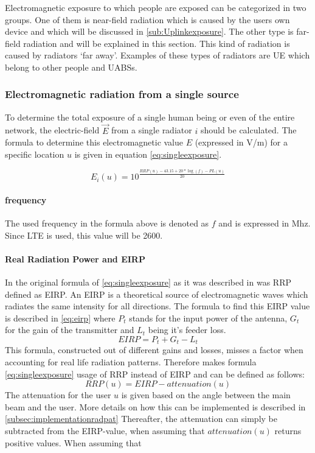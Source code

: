 Electromagnetic exposure to which people are exposed can be categorized in two groups. One of them is near-field radiation which is caused 
by the users own device and which will be discussed in \ref{sub:Uplinkexposure}.
The other type is far-field radiation and will be explained in this section. This kind of radiation is caused by radiators `far away'.
Examples of these types of radiators are \gls{UE} which belong to other people and \gls{UABS}s. 

\subsubsection{Electromagnetic radiation from a single source}
\label{sec:calculatingexposure}

To determine the total exposure of a single human being or even of the entire network, the electric-field $\vec{E}$ from a single radiator $i$ should be calculated.
The formula to determine this electromagnetic value $E$ (expressed in V/m) for a specific location $u$ is given in equation \ref{eq:singleexposure}.

\begin{equation}
E_i(u) = 10^{\frac{RRP(u) - 43.15 + 20*\log(f)- PL(u)}{20}}
\label{eq:singleexposure}
\end{equation}

\paragraph{frequency}
The used frequency in the formula above is denoted as $f$ and is expressed in Mhz. Since LTE is used, this value will be 2600.

\paragraph{Real Radiation Power and EIRP}
In the original formula of \ref{eq:singleexposure} as it was described in \cite{J1, J6_originalExposureFormula} 
was \gls{RRP} defined as \gls{EIRP}. An \gls{EIRP} is a theoretical source of electromagnetic waves which radiates the same intensity for all directions. 
The formula to find this \gls{EIRP} value is described in \ref{eq:eirp}
where $P_t$ stands for the input power of the antenna, $G_t$ for the gain of the transmitter and $L_t$ being it's feeder loss.
\begin{equation}
EIRP = P_t + G_t - L_t
\label{eq:eirp}
\end{equation}
This formula, constructed out of different gains and losses, misses a factor when accounting for real life radiation patterns.
Therefore makes formula \ref{eq:singleexposure} usage of \gls{RRP} instead of \gls{EIRP} and can be defined as follows:
\begin{equation}
RRP(u) = EIRP - attenuation(u)
\label{eq:rrp}
\end{equation}
The attenuation for the user $u$ is given based on the angle between the main beam and the user. More details on how this can be implemented is described in \ref{subsec:implementationradpat}
Thereafter, the attenuation can simply be subtracted from the EIRP-value, when assuming that $attenuation(u)$ returns positive values.
When assuming that 
